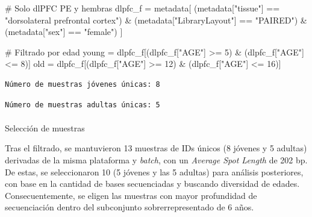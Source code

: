 \documentclass[
  12pt,
  letterpaper,
  DIV=11,
  numbers=noendperiod]{scrartcl}
\makeatletter
\let\oldparagraph\paragraph
\renewcommand{\paragraph}{
    \@ifstar
      \xxxParagraphStar
      \xxxParagraphNoStar
  }
\newcommand{\xxxParagraphStar}[1]{\oldparagraph*{#1}\mbox{}}
\newcommand{\xxxParagraphNoStar}[1]{\oldparagraph{#1}\mbox{}}
\newenvironment{Shaded}{\begin{snugshade}}{\end{snugshade}}
\newcommand{\CommentTok}[1]{\textcolor[rgb]{0.37,0.37,0.37}{#1}}
\newcommand{\DecValTok}[1]{\textcolor[rgb]{0.68,0.00,0.00}{#1}}
\newcommand{\NormalTok}[1]{\textcolor[rgb]{0.00,0.23,0.31}{#1}}
\newcommand{\OperatorTok}[1]{\textcolor[rgb]{0.37,0.37,0.37}{#1}}
\newcommand{\StringTok}[1]{\textcolor[rgb]{0.13,0.47,0.30}{#1}}
\makeatother
\begin{document}
\begin{Shaded}
\begin{Highlighting}[]
\CommentTok{\# Solo dlPFC PE y hembras}
\NormalTok{dlpfc\_f }\OperatorTok{=}\NormalTok{ metadata[}
\NormalTok{  (metadata[}\StringTok{"tissue"}\NormalTok{] }\OperatorTok{==} \StringTok{"dorsolateral prefrontal cortex"}\NormalTok{) }\OperatorTok{\&}
\NormalTok{  (metadata[}\StringTok{"LibraryLayout"}\NormalTok{] }\OperatorTok{==} \StringTok{"PAIRED"}\NormalTok{) }\OperatorTok{\&}
\NormalTok{  (metadata[}\StringTok{"sex"}\NormalTok{] }\OperatorTok{==} \StringTok{"female"}\NormalTok{)}
\NormalTok{  ]}

\CommentTok{\# Filtrado por edad}
\NormalTok{young }\OperatorTok{=}\NormalTok{ dlpfc\_f[(dlpfc\_f[}\StringTok{"AGE"}\NormalTok{] }\OperatorTok{\textgreater{}=} \DecValTok{5}\NormalTok{) }\OperatorTok{\&}\NormalTok{ (dlpfc\_f[}\StringTok{"AGE"}\NormalTok{] }\OperatorTok{\textless{}=} \DecValTok{8}\NormalTok{)]}
\NormalTok{old }\OperatorTok{=}\NormalTok{ dlpfc\_f[(dlpfc\_f[}\StringTok{"AGE"}\NormalTok{] }\OperatorTok{\textgreater{}=} \DecValTok{12}\NormalTok{) }\OperatorTok{\&}\NormalTok{ (dlpfc\_f[}\StringTok{"AGE"}\NormalTok{] }\OperatorTok{\textless{}=} \DecValTok{16}\NormalTok{)]}
\end{Highlighting}
\end{Shaded}

\begin{verbatim}
Número de muestras jóvenes únicas: 8
\end{verbatim}

\begin{verbatim}
Número de muestras adultas únicas: 5
\end{verbatim}

\paragraph{Selección de muestras}\label{selecciuxf3n-de-muestras}

Tras el filtrado, se mantuvieron 13 muestras de IDs únicos (8 jóvenes y
5 adultas) derivadas de la misma plataforma y \emph{batch}, con un
\emph{Average Spot Length} de 202 bp. De estas, se seleccionaron 10 (5
jóvenes y las 5 adultas) para análisis posteriores, con base en la
cantidad de bases secuenciadas y buscando diversidad de edades.
Consecuentemente, se eligen las muestras con mayor profundidad de
secuenciación dentro del subconjunto sobrerrepresentado de 6 años.
\end{document}
